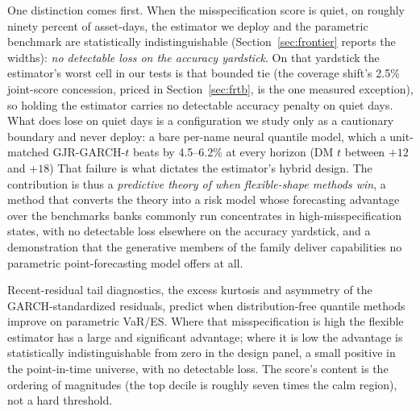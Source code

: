 \documentclass[11pt]{article}
\theoremstyle{remark}
\begin{document}
One distinction comes first. When the misspecification score is quiet, on
roughly ninety percent of asset-days, the estimator we deploy and the
parametric benchmark are statistically indistinguishable
(Section~\ref{sec:frontier} reports the widths): \emph{no
detectable loss on the accuracy yardstick}. On that yardstick the
estimator's worst cell in our tests is that bounded tie (the coverage
shift's 2.5\% joint-score concession, priced in
Section~\ref{sec:frtb}, is the one measured exception), so holding the
estimator carries no detectable accuracy penalty on quiet days. What does lose on quiet days is a configuration we study only
as a cautionary boundary and never deploy: a bare per-name neural
quantile model, which a unit-matched GJR-GARCH-$t$ beats by
4.5--6.2\% at every horizon (DM $t$ between $+12$ and
$+18$) That failure is what dictates the estimator's hybrid design. The
contribution is thus a \emph{predictive theory of when flexible-shape
methods win}, a method that converts the theory into a risk model
whose forecasting advantage over the benchmarks banks commonly run
concentrates in high-misspecification states, with no detectable loss
elsewhere on the accuracy yardstick, and a demonstration that the generative members of the
family deliver capabilities no parametric point-forecasting model
offers at all.

Recent-residual tail diagnostics, the excess kurtosis and asymmetry of
the GARCH-standardized residuals, predict when distribution-free
quantile methods improve on parametric VaR/ES. Where
that misspecification is high the flexible estimator has a large and
significant advantage; where it is low the advantage is
statistically indistinguishable from zero in the design panel, a small
positive in the point-in-time universe, with no detectable loss. The
score's content is the ordering of magnitudes (the top decile is
roughly seven times the calm region), not a hard threshold.
\end{document}
